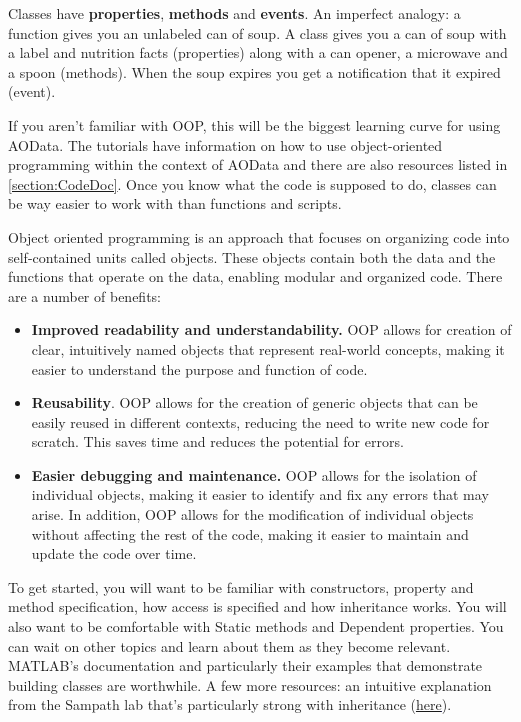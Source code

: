 \documentclass[10pt]{exam}
\newcommand\myurl[1]{\textcolor{blue}{\underline{#1}}}
\begin{document}
		Classes have \textbf{properties}, \textbf{methods} and \textbf{events}. An imperfect analogy: a function gives you an unlabeled can of soup. A class gives you a can of soup with a label and nutrition facts (properties) along with a can opener, a microwave and a spoon (methods). When the soup expires you get a notification that it expired (event). 
		
		If you aren't familiar with OOP, this will be the biggest learning curve for using AOData. The tutorials have information on how to use object-oriented programming within the context of AOData and there are also resources listed in \ref{section:CodeDoc}.	Once you know what the code is supposed to do, classes can be way easier to work with than functions and scripts.  
		
		Object oriented programming is an approach that focuses on organizing code into self-contained units called objects. These objects contain both the data and the functions that operate on the data, enabling modular and organized code. There are a number of benefits:
		\begin{itemize}
			\item \textbf{Improved readability and understandability.} OOP allows for creation of clear, intuitively named objects that represent real-world concepts, making it easier to understand the purpose and function of code. 
			\item \textbf{Reusability}. OOP allows for the creation of generic objects that can be easily reused in different contexts, reducing the need to write new code for scratch. This saves time and reduces the potential for errors.
			\item \textbf{Easier debugging and maintenance.} OOP allows for the isolation of individual objects, making it easier to identify and fix any errors that may arise. In addition, OOP allows for the modification of individual objects without affecting the rest of the code, making it easier to maintain and update the code over time. 
		\end{itemize}
		
		To get started, you will want to be familiar with constructors, property and method specification, how access is specified and how inheritance works. You will also want to be comfortable with Static methods and Dependent properties. You can wait on other topics and learn about them as they become relevant. 
		MATLAB's documentation and particularly their examples that demonstrate building classes are worthwhile. A few more resources: an intuitive explanation from the Sampath lab that's particularly strong with inheritance (\myurl{\href{https://github.com/sampath-lab-ucla/MATLAB_Resources/blob/master/Introduction_08_OOP.m}{here}}). 		
\end{document}
